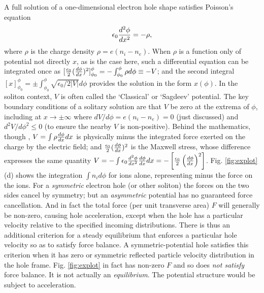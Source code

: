 \documentclass[pre]{revtex4-2}
\begin{document}
A full solution of a one-dimensional electron hole shape satisfies
Poisson's equation
\begin{equation}
  \label{eq:poisson}
  \epsilon_0{d^2\phi\over dx^2} = -\rho,
\end{equation}
where $\rho$ is the charge density $\rho=e(n_i-n_e)$. When $\rho$ is a
function only of potential not directly $x$, as is the case here, such
a differential equation can be integrated once as
$[{\epsilon_0\over 2}({d\phi\over
  dx})^2]_{\phi_0}^\phi=-\int_{\phi_0}^\phi\rho d\phi\equiv-V$; and
the second integral
$[x]_{\phi_0}^\phi=\pm\int_{\phi_0}^\phi \sqrt{\epsilon_0/2|V|}d\phi$
provides the solution in the form $x(\phi)$. In the soliton context,
$V$ is often called the `Classical' or `Sagdeev' potential. The key
boundary conditions of a solitary solution are that $V$ be zero at the
extrema of $\phi$, including at $x\to\pm \infty$ where
$dV/d\phi=e(n_i-n_e)=0$ (just discussed) and $d^2V/d\phi^2\le 0$ (to
ensure the nearby $V$ is non-positive). Behind the mathematics, though
\cite{Andrews1971a}, $V=\int\rho{d\phi\over dx}dx$ is
physically minus the integrated force exerted on the charge by the
electric field; and ${\epsilon_0\over 2}({d\phi\over dx})^2$ is the
Maxwell stress, whose difference expresses the same quantity
$V = -\int\epsilon_0{d^2\phi\over dx^2}{d\phi\over
  dx}dx=-\left[{\epsilon_0\over2}\left(d\phi\over dx\right)^2\right]
$. Fig. \ref{fig:explot}(d) shows the integration $\int n_id\phi$ for
ions alone, representing minus the force on the ions.  For a
\emph{symmetric} electron hole (or other soliton) the forces on the
two sides cancel by symmetry; but an \emph{asymmetric} potential has
no guaranteed force cancellation. And in fact the total force (per
unit transverse area) $F$ will generally be non-zero, causing hole
acceleration, except when the hole has a particular velocity relative
to the specified incoming distributions.  There is thus an additional
criterion for a steady equilibrium that enforces a particular hole
velocity so as to satisfy force balance. A symmetric-potential hole
satisfies this criterion when it has zero or symmetric reflected
particle velocity distribution in the hole frame.
Fig. \ref{fig:explot} in fact has non-zero $F$ and so does \emph{not
  satisfy} force balance. It is not actually an
\emph{equilibrium}. The potential structure would be subject to
acceleration.
\end{document}
